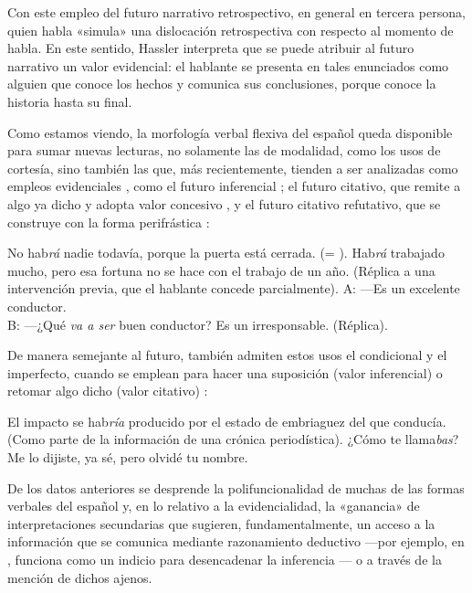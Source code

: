 Con este empleo del futuro narrativo retrospectivo, en general en tercera
persona, quien habla «simula» una dislocación retrospectiva con respecto al
momento de habla. En este sentido, Hassler interpreta que se puede atribuir al
futuro narrativo un valor evidencial: el hablante se presenta en tales
enunciados como alguien que conoce los hechos y comunica sus conclusiones, porque
conoce la historia hasta su final.

Como estamos viendo, la morfología verbal flexiva del español queda disponible
para sumar nuevas lecturas, no solamente las de modalidad, como los usos de
cortesía, sino también las que, más recientemente, tienden a ser analizadas como
empleos evidenciales \parencite{bermudez2016,garcianegroni2016,reyes1990}, como
el futuro inferencial ; el futuro citativo, que remite a algo
ya dicho y adopta valor concesivo , y el futuro citativo
refutativo, que se construye con la forma perifrástica
:

\begin{exe}
  \ex\label{ex:14-nadie} No hab\textit{rá} nadie todavía, porque la puerta está
      cerrada. (= ).
  \ex\label{ex:14-fortuna} Hab\textit{rá} trabajado mucho, pero esa fortuna no se
      hace con el trabajo de un año. (Réplica a una intervención previa, que el
      hablante concede parcialmente).
  \ex\label{ex:14-conductor} A: ---Es un excelente conductor.\\
      B: ---¿Qué \textit{va a ser} buen conductor? Es un irresponsable.
      (Réplica).
\end{exe}

De manera semejante al futuro, también admiten estos usos el condicional y el
imperfecto, cuando se emplean para hacer una suposición (valor inferencial)
 o retomar algo dicho (valor citativo)
:

\begin{exe}
  \ex\label{ex:14-impacto} El impacto se hab\textit{ría} producido por el estado
      de embriaguez del que conducía. (Como parte de la información de una
      crónica periodística).
  \ex\label{ex:14-llamabas} ¿Cómo te llama\textit{bas}? Me lo dijiste, ya sé,
      pero olvidé tu nombre.
\end{exe}

\begin{destacado}
De los datos anteriores se desprende la polifuncionalidad de muchas de las formas
verbales del español y, en lo relativo a la evidencialidad, la «ganancia» de
interpretaciones secundarias que sugieren, fundamentalmente, un acceso a la
información que se comunica mediante razonamiento deductivo ---por ejemplo, en
,  funciona como un indicio para
desencadenar la inferencia --- o a través de la
mención de dichos ajenos.
\end{destacado}

